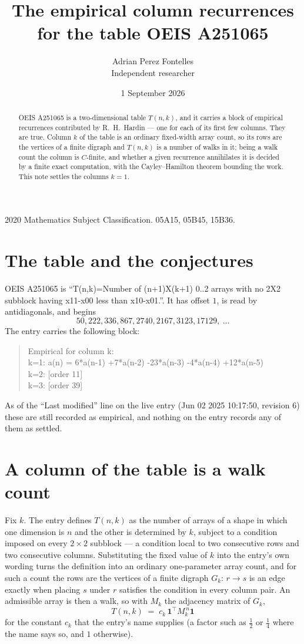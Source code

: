\documentclass[11pt,a4paper]{article}
\title{The empirical column recurrences for the table OEIS A251065}
\author{Adrian Perez Fontelles\\ \small Independent researcher}
\date{1 September 2026}
\theoremstyle{plain}
\theoremstyle{definition}
\begin{document}
\maketitle

\begin{abstract}
OEIS A251065 is a two-dimensional table $T(n,k)$, and it carries a block of empirical
recurrences contributed by R.~H.~Hardin --- one for each of its first few columns. They are
true. Column $k$ of the table is an ordinary fixed-width array count, so its rows are the
vertices of a finite digraph and $T(n,k)$ is a number of walks in it; being a walk count the
column is $C$-finite, and whether a given recurrence annihilates it is decided by a finite
exact computation, with the Cayley--Hamilton theorem bounding the work. This note settles the columns $k=1$.
\end{abstract}

\noindent\small 2020 Mathematics Subject Classification. 05A15, 05B45, 15B36.\normalsize

\section{The table and the conjectures}

OEIS A251065 is ``T(n,k)=Number of (n+1)X(k+1) 0..2 arrays with no 2X2 subblock having x11-x00 less than x10-x01.''. It has offset $1$, is
read by antidiagonals, and begins
\[
50, 222, 336, 867, 2740, 2167, 3123, 17129,\ \dots
\]
The entry carries the following block:
\begin{quote}\small
Empirical for column k:\\
k=1: a(n) = 6*a(n-1) +7*a(n-2) -23*a(n-3) -4*a(n-4) +12*a(n-5)\\
k=2: [order 11]\\
k=3: [order 39]\\
\end{quote}
As of the ``Last modified'' line on the live entry (Jun 02 2025 10:17:50, revision 6) these are still
recorded as empirical, and nothing on the entry records any of them as settled.

\section{A column of the table is a walk count}

Fix $k$. The entry defines $T(n,k)$ as the number of arrays of a shape in which one dimension
is $n$ and the other is determined by $k$, subject to a condition imposed on every
$2\times2$ subblock --- a condition local to two consecutive rows and two consecutive columns.
Substituting the fixed value of $k$ into the entry's own wording turns the definition into an
ordinary one-parameter array count, and for such a count the rows are the vertices of a finite
digraph $G_k$: $r\to s$ is an edge exactly when placing $s$ under $r$ satisfies the condition
in every column pair. An admissible array is then a walk, so with $M_k$ the adjacency matrix
of $G_k$,
\[
T(n,k)\;=\;c_k\,\mathbf{1}^{\!\top}M_k^{\,n}\mathbf{1}
\]
for the constant $c_k$ that the entry's name supplies (a factor such as $\tfrac12$ or
$\tfrac14$ where the name says so, and $1$ otherwise).
\end{document}

